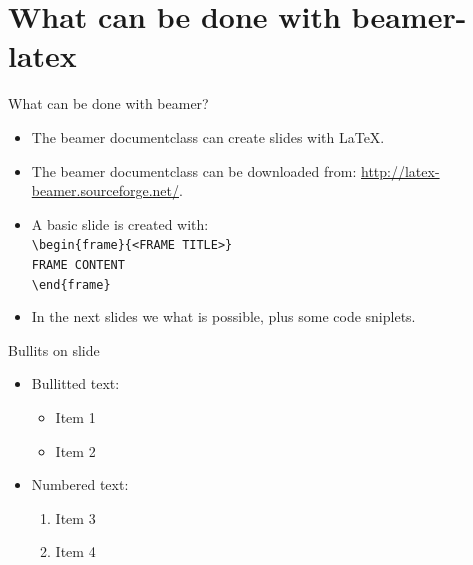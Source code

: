 \documentclass[t,11pt]{beamer}
\begin{document}
\section{What can be done with beamer-latex}

\begin{frame}[fragile]{What can be done with beamer?}
\begin{itemize}
\item	The beamer documentclass can create slides with \LaTeX.
\item	The beamer documentclass can be downloaded from:
		\url{http://latex-beamer.sourceforge.net/}.
\item	A basic slide is created with:\\
\vspace{0.1\baselineskip}
\verb|\begin{frame}{<FRAME TITLE>}|\\
\verb|FRAME CONTENT|\\
\verb|\end{frame}|\\
\vspace{0.5\baselineskip}
\item	In the next slides we what is possible, plus some
		code sniplets.
\end{itemize}
\end{frame}


\begin{frame}{Bullits on slide}
\begin{itemize}
\item \alert{Bullitted text:}
  \begin{itemize}
  \item Item 1
  \item Item 2
  \end{itemize}
\vspace{.5\baselineskip}

\item \alert{Numbered text:}
  \begin{enumerate}
  \item Item 3
  \item Item 4
  \end{enumerate}
\end{itemize}
\end{frame}
\end{document}

